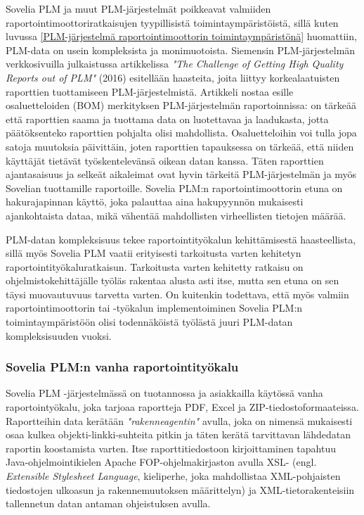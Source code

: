 Sovelia PLM ja muut PLM-järjestelmät poikkeavat valmiiden raportointimoottoriratkaisujen tyypillisistä toimintaympäristöistä, sillä kuten luvussa \ref{PLM-järjestelmä raportointimoottorin toimintaympäristönä} huomattiin, PLM-data on usein kompleksista ja monimuotoista. Siemensin PLM-järjestelmän verkkosivuilla julkaistussa artikkelissa \textit{"The Challenge of Getting High Quality Reports out of PLM"} \cite{german_challenge_2016} (2016) esitellään haasteita, joita liittyy korkealaatuisten raporttien tuottamiseen PLM-järjestelmistä. Artikkeli nostaa esille osaluetteloiden (BOM) merkityksen PLM-järjestelmän raportoinnissa: on tärkeää että raporttien saama ja tuottama data on luotettavaa ja laadukasta, jotta päätöksenteko raporttien pohjalta olisi mahdollista. Osaluetteloihin voi tulla jopa satoja muutoksia päivittäin, joten raporttien tapauksessa on tärkeää, että niiden käyttäjät tietävät työskentelevänsä oikean datan kanssa. Täten raporttien ajantasaisuus ja selkeät aikaleimat ovat hyvin tärkeitä PLM-järjestelmän ja myös Sovelian tuottamille raportoille. Sovelia PLM:n raportointimoottorin etuna on hakurajapinnan käyttö, joka palauttaa aina hakupyynnön mukaisesti ajankohtaista dataa, mikä vähentää mahdollisten virheellisten tietojen määrää.

PLM-datan kompleksisuus tekee raportointityökalun kehittämisestä haasteellista, sillä myös Sovelia PLM vaatii erityisesti tarkoitusta varten kehitetyn raportointityökaluratkaisun. Tarkoitusta varten kehitetty ratkaisu on ohjelmistokehittäjälle työläs rakentaa alusta asti itse, mutta sen etuna on sen täysi muovautuvuus tarvetta varten. On kuitenkin todettava, että myös valmiin raportointimoottorin tai -työkalun implementoiminen Sovelia PLM:n toimintaympäristöön olisi todennäköistä työlästä juuri PLM-datan kompleksisuuden vuoksi. 

\subsubsection{Sovelia PLM:n vanha raportointityökalu}

Sovelia PLM -järjestelmässä on tuotannossa ja asiakkailla käytössä vanha raportointyökalu, joka tarjoaa raportteja PDF, Excel ja ZIP-tiedostoformaateissa. Raportteihin data kerätään \textit{"rakenneagentin"} avulla, joka on nimensä mukaisesti osaa kulkea objekti-linkki-suhteita pitkin ja täten kerätä tarvittavan lähdedatan raportin koostamista varten. Itse raporttitiedostoon kirjoittaminen tapahtuu Java-ohjelmointikielen Apache FOP-ohjelmakirjaston \cite{noauthor_apachetm_nodate} avulla XSL- (engl. \textit{Extensible Stylesheet Language}, kieliperhe, joka mahdollistaa XML-pohjaisten tiedostojen ulkoasun ja rakennemuutoksen määrittelyn) ja XML-tietorakenteisiin tallennetun datan antaman ohjeistuksen avulla.

